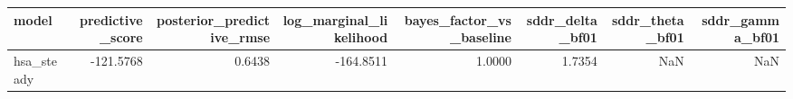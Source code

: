 \begin{tabular}{lrrrrrrr}
\toprule
model & predictive\_score & posterior\_predictive\_rmse & log\_marginal\_likelihood & bayes\_factor\_vs\_baseline & sddr\_delta\_bf01 & sddr\_theta\_bf01 & sddr\_gamma\_bf01 \\
\midrule
hsa\_steady & -121.5768 & 0.6438 & -164.8511 & 1.0000 & 1.7354 & NaN & NaN \\
\bottomrule
\end{tabular}
